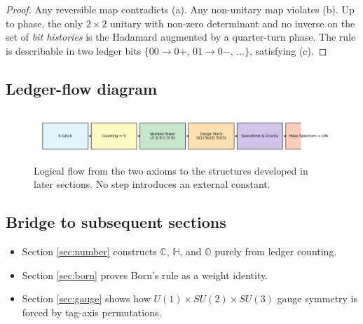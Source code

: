 \begin{proof}
Any reversible map contradicts (a).  
Any non-unitary map violates (b).  
Up to phase, the only $2\!\times\!2$ unitary with non-zero determinant
and no inverse on the set of \emph{bit histories} is the Hadamard
augmented by a quarter-turn phase.  The rule is describable in two
ledger bits $\{00\!\to\!0+,\,01\!\to\!0-,\,\dots\}$, satisfying (c).
\end{proof}

\subsection{Ledger-flow diagram}

\begin{figure}[t]
  \centering
  \includegraphics[width=\linewidth]{figs/axiom_flow.png}
  \caption{Logical flow from the two axioms to the structures developed
           in later sections.  No step introduces an external constant.}
  \label{fig:axiom-flow}
\end{figure}

\subsection{Bridge to subsequent sections}

\begin{itemize}
  \item Section \ref{sec:number} constructs $\mathbb C$, $\mathbb H$,
        and $\mathbb O$ purely from ledger counting.
  \item Section \ref{sec:born} proves Born's rule as a weight identity.
  \item Section \ref{sec:gauge} shows how $U(1)\!\times SU(2)\!\times SU(3)$
        gauge symmetry is forced by tag-axis permutations.
\end{itemize}

\clearpage
